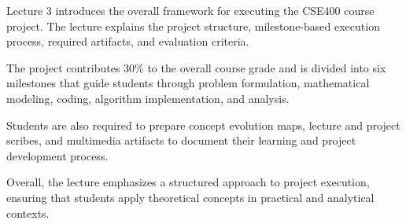 \documentclass[12pt,a4paper]{article}
\begin{document}
Lecture 3 introduces the overall framework for executing the CSE400 course project. The lecture explains the project structure, milestone-based execution process, required artifacts, and evaluation criteria.

The project contributes 30\% to the overall course grade and is divided into six milestones that guide students through problem formulation, mathematical modeling, coding, algorithm implementation, and analysis.

Students are also required to prepare concept evolution maps, lecture and project scribes, and multimedia artifacts to document their learning and project development process.

Overall, the lecture emphasizes a structured approach to project execution, ensuring that students apply theoretical concepts in practical and analytical contexts.
\end{document}
